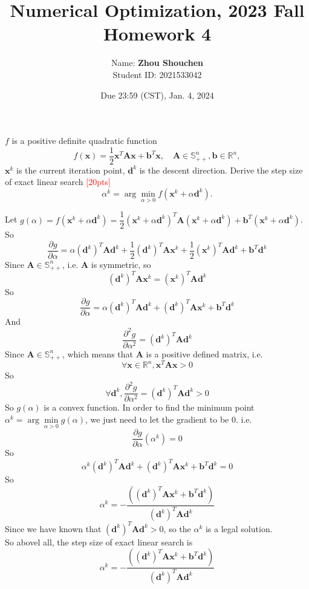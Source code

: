 \documentclass[10pt]{article}
\newenvironment{problem}[2][Problem]{\begin{trivlist}
\item[\hskip \labelsep {\bfseries #1}\hskip \labelsep {\bfseries #2.}]}{\end{trivlist}}
\begin{document}
\title{	Numerical Optimization, 2023 Fall\\Homework 4}
\date{Due 23:59 (CST), Jan. 4, 2024 }

\author{
    Name: \textbf{Zhou Shouchen} \\
	Student ID: 2021533042
}

\maketitle
\newpage


\begin{problem}{1}
    $f$ is a positive definite quadratic function $$f(\pmb x) = \frac{1}{2}\pmb x^T\pmb A\pmb x + \pmb b^T\pmb x,  \quad \pmb A \in \mathbb{S}_{++}^n, \pmb b \in \mathbb{R}^n,$$ $\pmb x^k$ is the current iteration point, $\pmb d^k$ is the descent direction. Derive the step size of exact linear search \textcolor{red}{[20pts]} $$\alpha^k = \arg\min_{\alpha > 0}f(\pmb x^k + \alpha \pmb d^k).$$
\end{problem}

Let $g(\alpha)=f(\pmb x^k+\alpha\pmb d^k)=\dfrac{1}{2}(\pmb x^k+\alpha\pmb d^k)^T\pmb A(\pmb x^k+\alpha\pmb d^k)+\pmb b^T(\pmb x^k+\alpha\pmb d^k)$.\\
So $$\dfrac{\partial g}{\partial \alpha}=\alpha(\pmb d^k)^T\pmb A\pmb d^k+\dfrac{1}{2}(\pmb d^k)^T\pmb A\pmb x^k+\dfrac{1}{2}(\pmb x^k)^T\pmb A\pmb d^k+\pmb b^T\pmb d^k$$
Since $\pmb A\in \mathbb{S}_{++}^n$, i.e. $\pmb A$ is symmetric, so $$(\pmb d^k)^T\pmb A\pmb x^k=(\pmb x^k)^T\pmb A\pmb d^k$$
So $$\dfrac{\partial g}{\partial\alpha}=\alpha(\pmb d^k)^T\pmb A\pmb d^k+(\pmb d^k)^T\pmb A\pmb x^k+\pmb b^T\pmb d^k$$
And $$\dfrac{\partial^2 g}{\partial\alpha^2}=(\pmb d^k)^T\pmb A\pmb d^k$$
Since $\pmb A\in \mathbb{S}_{++}^n$, which means that $\pmb A$ is a positive defined matrix, i.e. 
$$\forall \pmb x\in \mathbb{R}^n, \pmb x^T\pmb A\pmb x>0$$
So $$\forall\pmb d^k, \dfrac{\partial^2 g}{\partial\alpha^2}=(\pmb d^k)^T\pmb A\pmb d^k>0$$
So $g(\alpha)$ is a convex function. In order to find the minimum point $\alpha^k = \arg\min\limits_{\alpha > 0}g(\alpha)$, we just need to let the gradient to be $0$.
i.e. $$\dfrac{\partial g}{\partial\alpha}(\alpha^k)=0$$
So $$\alpha^k(\pmb d^k)^T\pmb A\pmb d^k+(\pmb d^k)^T\pmb A\pmb x^k+\pmb b^T\pmb d^k=0$$
So $$\alpha^k = -\dfrac{((\pmb d^k)^T\pmb A\pmb x^k+\pmb b^T\pmb d^k)}{(\pmb d^k)^T\pmb A\pmb d^k}$$
Since we have known that $(\pmb d^k)^T\pmb A\pmb d^k>0$, so the $\alpha^k$ is a legal solution.\\
So abovel all, the step size of exact linear search is
$$\alpha^k = -\dfrac{((\pmb d^k)^T\pmb A\pmb x^k+\pmb b^T\pmb d^k)}{(\pmb d^k)^T\pmb A\pmb d^k}$$
\end{document}
